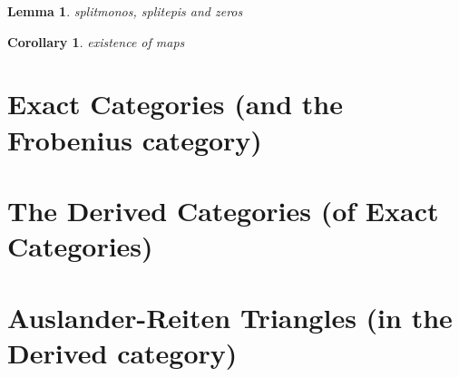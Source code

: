 \documentclass[12pt]{article}
\newtheorem{corollary}{Corollary}[theorem]
\newtheorem{lemma}[theorem]{Lemma}
\theoremstyle{definition}
\theoremstyle{remark}
\begin{document}
        \begin{lemma}
            splitmonos, splitepis and zeros
        \end{lemma}

        \begin{corollary}
            existence of maps
        \end{corollary}
    \section{Exact Categories (and the Frobenius category)}
    \section{The Derived Categories (of Exact Categories)}
    \section{Auslander-Reiten Triangles (in the Derived category)}
\end{document}
